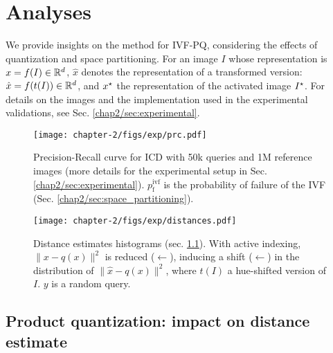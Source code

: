 
\section{Analyses}\label{chap2/sec:analyses}

We provide insights on the method for IVF-PQ, considering the effects of quantization and space partitioning.
For an image $I$ whose representation is $x=f(I)\in\mathbb{R}^d$, 
$\hat{x}$ denotes the representation of a transformed version: $\hat{x} = f(t(I))\in\mathbb{R}^d$, and $x^\star$ the representation of the activated image $I^\star$.
For details on the images and the implementation used in the experimental validations, see Sec. \ref{chap2/sec:experimental}.

\begin{figure}[b!]
   \begin{minipage}{0.45\textwidth}
        \centering
        \vspace{3pt}
        \texttt{[image: chapter-2/figs/exp/prc.pdf]}
        \caption{Precision-Recall curve for ICD with 50k queries and 1M reference images (more details for the experimental setup in Sec. \ref{chap2/sec:experimental}). $p_\mathrm{f}^{\mathrm{ivf}}$ is the probability of failure of the IVF (Sec. \ref{chap2/sec:space_partitioning}).
        }
        \label{chap2/fig:prc}
   \end{minipage}\hfill
      \begin{minipage}{0.51\textwidth}
        \centering
        \texttt{[image: chapter-2/figs/exp/distances.pdf]}
        \caption{
            Distance estimates histograms (sec. \ref{chap2/sec:quantization}).
            With active indexing, $\|x- q(x)\|^2$ is reduced ({\color{blue}$\leftarrow$}), inducing a shift ({\color{orange}$\leftarrow$}) in the distribution of $\|\hat{x}- q(x)\|^2$, where $t(I)$ a hue-shifted version of $I$.
            $y$ is a random query.
        }
        \label{chap2/fig:dists}
   \end{minipage}
\end{figure}


\subsection{Product quantization: impact on distance estimate}\label{chap2/sec:quantization}

